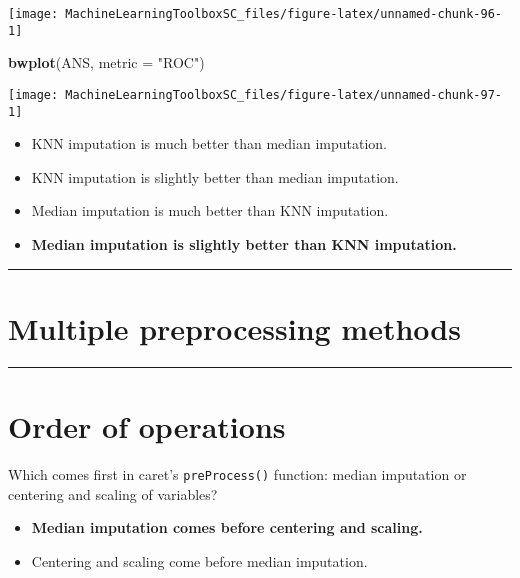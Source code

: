 \documentclass[]{book}
\newenvironment{Shaded}{\begin{snugshade}}{\end{snugshade}}
\newcommand{\KeywordTok}[1]{\textcolor[rgb]{0.13,0.29,0.53}{\textbf{#1}}}
\newcommand{\DataTypeTok}[1]{\textcolor[rgb]{0.13,0.29,0.53}{#1}}
\newcommand{\StringTok}[1]{\textcolor[rgb]{0.31,0.60,0.02}{#1}}
\newcommand{\NormalTok}[1]{#1}
\begin{document}
\begin{center}\texttt{[image: MachineLearningToolboxSC\_files/figure-latex/unnamed-chunk-96-1]} \end{center}

\begin{Shaded}
\begin{Highlighting}[]
\KeywordTok{bwplot}\NormalTok{(ANS, }\DataTypeTok{metric =} \StringTok{"ROC"}\NormalTok{)}
\end{Highlighting}
\end{Shaded}

\begin{center}\texttt{[image: MachineLearningToolboxSC\_files/figure-latex/unnamed-chunk-97-1]} \end{center}

\begin{itemize}
\item
  KNN imputation is much better than median imputation.
\item
  KNN imputation is slightly better than median imputation.
\item
  Median imputation is much better than KNN imputation.
\item
  \textbf{Median imputation is slightly better than KNN imputation.}
\end{itemize}

\begin{center}\rule{0.5\linewidth}{\linethickness}\end{center}

\section*{Multiple preprocessing
methods}\label{multiple-preprocessing-methods}

\begin{center}\rule{0.5\linewidth}{\linethickness}\end{center}

\section*{Order of operations}\label{order-of-operations}

Which comes first in caret's \texttt{preProcess()} function: median
imputation or centering and scaling of variables?

\begin{itemize}
\item
  \textbf{Median imputation comes before centering and scaling.}
\item
  Centering and scaling come before median imputation.
\end{itemize}
\end{document}
